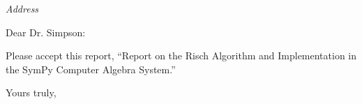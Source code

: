 \documentclass{letter}
\begin{document}
\begin{letter}{\emph{Address}}
\opening{Dear Dr. Simpson:}

Please accept this report, ``Report  on the Risch Algorithm and Implementation
in the Sym\-Py Computer Algebra System.''  

\closing{Yours truly,}
\end{letter}
\end{document}
